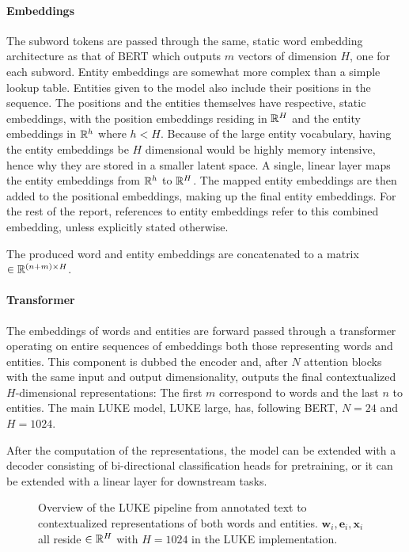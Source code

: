 \documentclass[main.tex]{subfiles}
\begin{document}
\paragraph{Embeddings}
The subword tokens are passed through the same, static word embedding architecture as that of BERT which outputs $m$ vectors of dimension $H$, one for each subword.
Entity embeddings are somewhat more complex than a simple lookup table.
Entities given to the model also include their positions in the sequence.
The positions and the entities themselves have respective, static embeddings, with the position embeddings residing in $ \mathbb R^H $ and the entity embeddings in $ \mathbb R^h $ where $ h<H $.
Because of the large entity vocabulary, having the entity embeddings be $ H $ dimensional would be highly memory intensive, hence why they are stored in a smaller latent space.
A single, linear layer maps the entity embeddings from $ \mathbb R^h $ to $ \mathbb R^H $.
The mapped entity embeddings are then added to the positional embeddings, making up the final entity embeddings.
For the rest of the report, references to entity embeddings refer to this combined embedding, unless explicitly stated otherwise.

The produced word and entity embeddings are concatenated to a matrix $\in \mathbb R^{(n+m)\times H}$.

\paragraph{Transformer}
The embeddings of words and entities are forward passed through a transformer operating on entire sequences of embeddings both those representing words and entities.
This component is dubbed the encoder and, after $N$ attention blocks with the same input and output dimensionality, outputs the final contextualized $H$-dimensional representations:
The first $m$ correspond to words and the last $n$ to entities.
The main LUKE model, LUKE large, has, following BERT, $N=24$ and $H=1024$.

After the computation of the representations, the model can be extended with a decoder consisting of bi-directional classification heads for pretraining, or it can be extended with a linear layer for downstream tasks.
\begin{figure}[H]
    \centering
        
    \caption{
        Overview of the LUKE pipeline from annotated text to contextualized representations of both words and entities.
        $\mathbf w_i, \mathbf e_i, \mathbf x_i$ all reside $\in \mathbb R^H$ with $H=1024$ in the LUKE implementation.
    }
    \label{fig:luke}
\end{figure}\noindent
\end{document}
